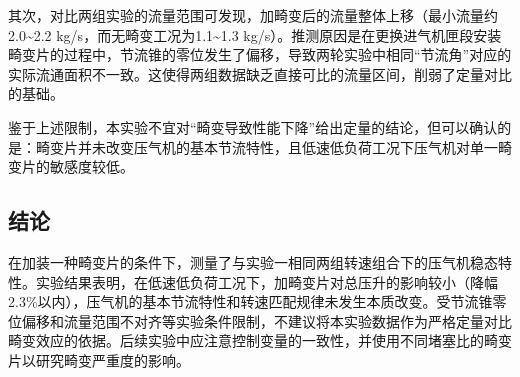 其次，对比两组实验的流量范围可发现，加畸变后的流量整体上移（最小流量约2.0\textasciitilde2.2 kg/s，而无畸变工况为1.1\textasciitilde1.3 kg/s）。推测原因是在更换进气机匣段安装畸变片的过程中，节流锥的零位发生了偏移，导致两轮实验中相同``节流角''对应的实际流通面积不一致。这使得两组数据缺乏直接可比的流量区间，削弱了定量对比的基础。

鉴于上述限制，本实验不宜对``畸变导致性能下降''给出定量的结论，但可以确认的是：畸变片并未改变压气机的基本节流特性，且低速低负荷工况下压气机对单一畸变片的敏感度较低。

\subsection{结论}

在加装一种畸变片的条件下，测量了与实验一相同两组转速组合下的压气机稳态特性。实验结果表明，在低速低负荷工况下，加畸变片对总压升的影响较小（降幅2.3\%以内），压气机的基本节流特性和转速匹配规律未发生本质改变。受节流锥零位偏移和流量范围不对齐等实验条件限制，不建议将本实验数据作为严格定量对比畸变效应的依据。后续实验中应注意控制变量的一致性，并使用不同堵塞比的畸变片以研究畸变严重度的影响。
